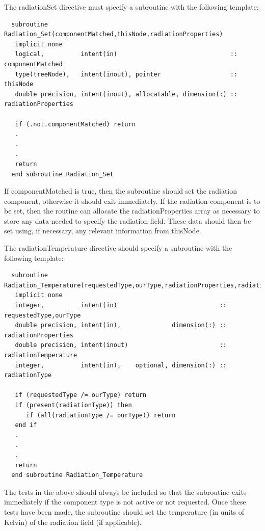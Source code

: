 The {\normalfont \ttfamily radiationSet} directive must specify a subroutine with the following template:
\begin{verbatim}
  subroutine Radiation_Set(componentMatched,thisNode,radiationProperties)
   implicit none
   logical,          intent(in)                               :: componentMatched
   type(treeNode),   intent(inout), pointer                   :: thisNode
   double precision, intent(inout), allocatable, dimension(:) :: radiationProperties

   if (.not.componentMatched) return
   .
   .
   .
   return
  end subroutine Radiation_Set
\end{verbatim}
If {\normalfont \ttfamily componentMatched} is true, then the subroutine should set the radiation component, otherwise it should exit immediately. If the radiation component is to be set, then the routine can allocate the {\normalfont \ttfamily radiationProperties} array as necessary to store any data needed to specify the radiation field. These data should then be set using, if necessary, any relevant information from {\normalfont \ttfamily thisNode}.

The {\normalfont \ttfamily radiationTemperature} directive should specify a subroutine with the following template:
\begin{verbatim}
  subroutine Radiation_Temperature(requestedType,ourType,radiationProperties,radiationTemperature,radiationType)
   implicit none
   integer,          intent(in)                            :: requestedType,ourType
   double precision, intent(in),              dimension(:) :: radiationProperties
   double precision, intent(inout)                         :: radiationTemperature
   integer,          intent(in),    optional, dimension(:) :: radiationType

   if (requestedType /= ourType) return
   if (present(radiationType)) then
      if (all(radiationType /= ourType)) return
   end if
   .
   .
   .
   return
  end subroutine Radiation_Temperature
\end{verbatim}
The tests in the above should always be included so that the subroutine exits immediately if the component type is not active or not requested. Once these tests have been made, the subroutine should set the temperature (in units of Kelvin) of the radiation field (if applicable).

